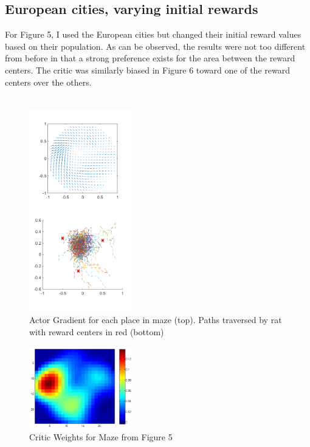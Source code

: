 \documentclass[conference]{IEEEtran}
\begin{document}
\subsection{European cities, varying initial rewards}

For Figure 5, I used the European cities but changed their initial reward values based on their population. As can be observed, the results were not too different from before in that a strong preference exists for the area between the reward centers. The critic was similarly biased in Figure 6 toward one of the reward centers over the others.\\
\\
\begin{figure}
\includegraphics[width=0.4\textwidth]{waterMazeRevised2_Figure_populationRewards.png} 
\caption{Actor Gradient for each place in maze (top). Paths traversed by rat with reward centers in red (bottom)}
\end{figure}

\begin{figure}
\includegraphics[width=0.4\textwidth]{waterMazeRevised2_Critic_populationRewards.png} 
\caption{Critic Weights for Maze from Figure 5}
\end{figure}
\end{document}
